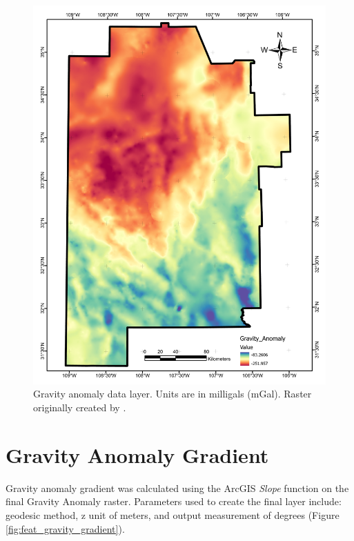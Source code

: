 \begin{figure}[H]
\centering
\includegraphics[width=0.75\linewidth]{templates/images/Figure-GravityAnomaly.pdf}
\caption[Gravity anomaly data layer]{Gravity anomaly data layer. Units are in milligals (mGal). Raster originally created by \protect\citet{bielicki_hydrogeolgic_2015}.}
\label{fig:feat_gravity}
\end{figure}
\pagebreak

\section{Gravity Anomaly Gradient}\label{app:dl_grav_gradient}
Gravity anomaly gradient was calculated using the ArcGIS \textit{Slope} function on the final Gravity Anomaly raster. Parameters used to create the final layer include: geodesic method, z unit of meters, and output measurement of degrees (Figure \ref{fig:feat_gravity_gradient}).

